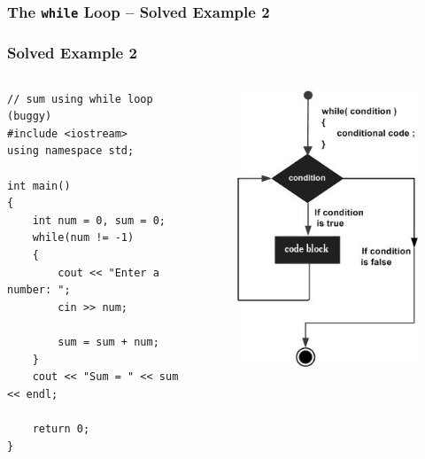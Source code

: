 \documentclass{beamer}
\begin{document}
\begin{frame} [fragile]
    \frametitle{The \texttt{while} Loop -- Solved Example 2}
    \subsubsection{Solved Example 2} %
    \label{ssub:while_solved_example_2}
    \begin{columns}
        \lstset{style=mystyle}
\begin{lstlisting}
// sum using while loop (buggy)
#include <iostream>
using namespace std;

int main()
{
    int num = 0, sum = 0;
    while(num != -1)
    {
        cout << "Enter a number: ";
        cin >> num;

        sum = sum + num;
    }
    cout << "Sum = " << sum << endl;

    return 0;
}
\end{lstlisting}
            \begin{figure}
                \centering
                \includegraphics[scale=0.4]{while}
            \end{figure}
    \end{columns}
\end{frame}
\end{document}
